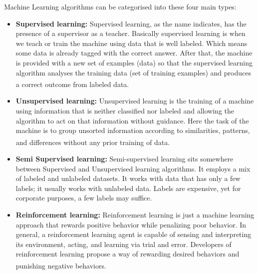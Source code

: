 Machine Learning algorithms can be categorised into these four main types:

\begin{itemize}
    \item \textbf{Supervised learning:}
        Supervised learning, as the name indicates, has the presence of a supervisor as a teacher. Basically supervised learning is when we teach or train the machine using data that is well labeled. Which means some data is already tagged with the correct answer. After that, the machine is provided with a new set of examples (data) so that the supervised learning algorithm analyses the training data (set of training examples) and produces a correct outcome from labeled data. \textsuperscript{\cite{AITypes-GeeksForGeeks}}

    \item \textbf{Unsupervised learning:}
        Unsupervised learning is the training of a machine using information that is neither classified nor labeled and allowing the algorithm to act on that information without guidance. Here the task of the machine is to group unsorted information according to similarities, patterns, and differences without any prior training of data. \textsuperscript{\cite{AITypes-GeeksForGeeks}}

    \vspace{0.2in}

    

    \item \textbf{Semi Supervised learning:}
        Semi-supervised learning sits somewhere between Supervised and Unsupervised learning algorithms. It employs a mix of labeled and unlabeled datasets. It works with data that has only a few labels; it usually works with unlabeled data. Labels are expensive, yet for corporate purposes, a few labels may suffice.
    \item \textbf{Reinforcement learning:}
        Reinforcement learning is just a machine learning approach that rewards positive behavior while penalizing poor behavior. In general, a reinforcement learning agent is capable of sensing and interpreting its environment, acting, and learning via trial and error. Developers of reinforcement learning propose a way of rewarding desired behaviors and punishing negative behaviors. \textsuperscript{\cite{SSLvsRL-askanydifference}}

    \vspace{0.2in}

    
\end{itemize}

